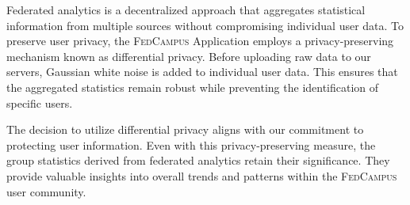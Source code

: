 \documentclass[11pt,a4paper,oneside]{report}
\newcommand{\instructions}[1]{{\color{orange}\itshape #1}}
\renewcommand{\instructions}[1]{} %
\newcommand{\fedcampus}{\textsc{FedCampus}\xspace}
\begin{document}
\instructions{This template can be viewed on Overleaf at
    \url{https://www.overleaf.com/read/hxjcgtkhjqcd}.  If you have an Overleaf
    account (either free or paid) you can copy this template to start a new
    Overleaf project.  If you do not want an Overleaf account you can install
    TeX on your computer and download the template files from Overleaf.  }

Federated analytics is a decentralized approach that aggregates statistical
information from multiple sources without compromising individual user data.
To preserve user privacy,
the \fedcampus Application employs a privacy-preserving mechanism known as
differential privacy. Before uploading raw data to our servers,
Gaussian white noise is added to individual user data.
This ensures that the aggregated statistics remain robust while preventing the
identification of specific users.

The decision to utilize differential privacy aligns with our commitment to
protecting user information. Even with this privacy-preserving measure,
the group statistics derived from federated analytics retain their significance.
They provide valuable insights into overall trends and patterns within the
\fedcampus user community.
\end{document}
